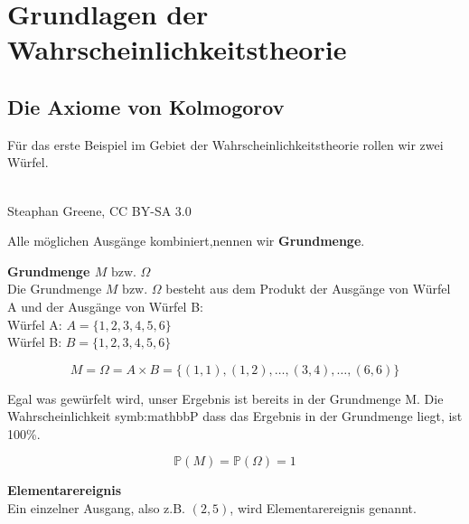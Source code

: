 {
    \chapter{Grundlagen der Wahrscheinlichkeitstheorie}
    \section{Die Axiome von Kolmogorov}

    Für das erste Beispiel im Gebiet der Wahrscheinlichkeitstheorie rollen
    wir zwei Würfel.\\

    \begin{minipage}{\linewidth}
        \centering
        \def\svgwidth{2cm}
        \\\tiny{Steaphan Greene, CC BY-SA 3.0}
    \end{minipage}

    \begin{definition}
    Alle möglichen Ausgänge kombiniert,nennen wir \textbf{Grundmenge}.
    \end{definition}

    \textbf{Grundmenge $M\text{ bzw. }\Omega$}\\

    Die Grundmenge $M\text{ bzw. }\Omega$ besteht aus dem Produkt der Ausgänge von Würfel A und der Ausgänge von Würfel B:\\
    Würfel A: $A=\{1,2,3,4,5,6\}$\\
    Würfel B: $B=\{1,2,3,4,5,6\}$

    \begin{equation*}
        M=\Omega =A\times B=\{\left(1,1\right),\left(1,2\right),\ldots,\left(3,4\right),\ldots ,\left(6,6\right)\}
    \end{equation*}
    
    Egal was gewürfelt wird, unser Ergebnis ist bereits in der Grundmenge M. 
    Die Wahrscheinlichkeit \gls{symb:mathbbP} dass das Ergebnis in der Grundmenge
    liegt, ist 100\%.

    \begin{equation*}
        \mathbb{P}\left(M\right)=\mathbb{P}(\Omega )=1
    \end{equation*}

    \textbf{Elementarereignis}\\
    Ein einzelner Ausgang, also z.B. $(2,5)$, wird Elementarereignis genannt.\\

}
